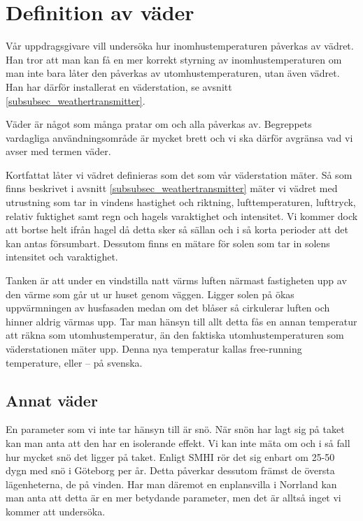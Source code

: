 \section{Definition av väder}
\label{subsec_weather}
Vår uppdragsgivare vill undersöka hur inomhustemperaturen påverkas av vädret. Han tror att man kan få en mer korrekt styrning av inomhustemperaturen om man inte bara låter den påverkas av utomhustemperaturen, utan även vädret. Han har därför installerat en väderstation, se avsnitt \ref{subsubsec_weathertransmitter}.

Väder är något som många pratar om och alla påverkas av. Begreppets vardagliga användningsområde är mycket brett och vi ska därför avgränsa vad vi avser med termen väder. 

Kortfattat låter vi vädret definieras som det som vår väderstation mäter. Så som finns beskrivet i avsnitt \ref{subsubsec_weathertransmitter} mäter vi vädret med utrustning som tar in vindens hastighet och riktning, lufttemperaturen, lufttryck, relativ fuktighet samt regn och hagels varaktighet och intensitet. Vi kommer dock att bortse helt ifrån hagel då detta sker så sällan och i så korta perioder att det kan antas försumbart.  Dessutom finns en mätare för solen som tar in solens intensitet och varaktighet. %

Tanken är att under en vindstilla natt värms luften närmast fastigheten upp av den värme som går ut ur huset genom väggen. Ligger solen på ökas uppvärmningen av husfasaden medan om det blåser så cirkulerar luften och hinner aldrig värmas upp. Tar man hänsyn till allt detta fås en annan temperatur att räkna som utomhustemperatur, än den faktiska utomhustemperaturen som väderstationen mäter upp. Denna nya temperatur kallas free-running temperature, eller -- på svenska. %



\subsection{Annat väder}
En parameter som vi inte tar hänsyn till är snö. När snön har lagt sig på taket kan man anta att den har en isolerande effekt. Vi kan inte mäta om och i så fall hur mycket snö det ligger på taket. Enligt SMHI %
rör det sig enbart om 25-50 dygn med snö i Göteborg per år. Detta påverkar dessutom främst de översta lägenheterna, de på vinden. Har man däremot en enplansvilla i Norrland kan man anta att detta är en mer betydande parameter, men det är alltså inget vi kommer att undersöka.

